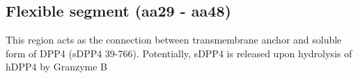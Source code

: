 \subsection{Flexible segment (aa29 - aa48)}

This region acts as the connection between transmembrane anchor and soluble form of DPP4 (sDPP4 39-766). Potentially, sDPP4 is released upon hydrolysis of hDPP4 by Granzyme B
